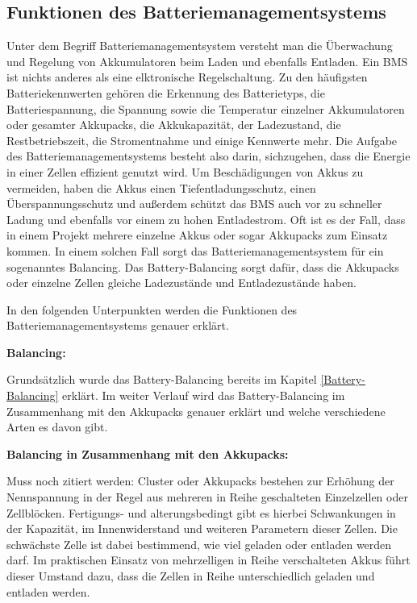 \subsection{Funktionen des Batteriemanagementsystems}

Unter dem Begriff Batteriemanagementsystem versteht man die Überwachung und Regelung von Akkumulatoren beim Laden und ebenfalls Entladen. Ein BMS ist nichts anderes als eine elktronische Regelschaltung. Zu den häufigsten Batteriekennwerten gehören die Erkennung des Batterietyps, die Batteriespannung, die Spannung sowie die Temperatur einzelner Akkumulatoren oder gesamter Akkupacks, die Akkukapazität, der Ladezustand, die Restbetriebszeit, die Stromentnahme und einige Kennwerte mehr. Die Aufgabe des Batteriemanagementsystems besteht also darin, sichzugehen, dass die Energie in einer Zellen effizient genutzt wird. Um Beschädigungen von Akkus zu vermeiden, haben die Akkus einen Tiefentladungsschutz, einen Überspannungsschutz und außerdem schützt das BMS auch vor zu schneller Ladung und ebenfalls vor einem zu hohen Entladestrom. Oft ist es der Fall, dass in einem Projekt mehrere einzelne Akkus oder sogar Akkupacks zum Einsatz kommen. In einem solchen Fall sorgt das Batteriemanagementsystem für ein sogenanntes Balancing. Das Battery-Balancing sorgt dafür, dass die Akkupacks oder einzelne Zellen gleiche Ladezustände und Entladezustände haben. 

In den folgenden Unterpunkten werden die Funktionen des Batteriemanagementsystems genauer erklärt.
\newpage

\textbf{Balancing:}

Grundsätzlich wurde das Battery-Balancing bereits im Kapitel \ref{Battery-Balancing} erklärt. Im weiter Verlauf wird das Battery-Balancing im Zusammenhang mit den Akkupacks genauer erklärt und welche verschiedene Arten es davon gibt.


\textbf{Balancing in Zusammenhang mit den Akkupacks:}

Muss noch zitiert werden: Cluster oder Akkupacks bestehen zur Erhöhung der Nennspannung in der Regel aus mehreren in Reihe geschalteten Einzelzellen oder Zellblöcken. Fertigungs- und alterungsbedingt gibt es hierbei Schwankungen in der Kapazität, im Innenwiderstand und weiteren Parametern dieser Zellen. Die schwächste Zelle ist dabei bestimmend, wie viel geladen oder entladen werden darf. Im praktischen Einsatz von mehrzelligen in Reihe verschalteten Akkus führt dieser Umstand dazu, dass die Zellen in Reihe unterschiedlich geladen und entladen werden.

